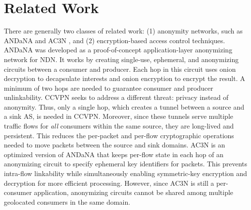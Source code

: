 \section{Related Work} \label{sec:related}

There are generally two classes of related work: (1) anonymity networks, such
as ANDaNA \cite{dibenedetto2011andana} and AC3N \cite{tsudik2016ac3n}, and
(2) encryption-based access control techniques. ANDaNA was developed as a
proof-of-concept application-layer anonymizing network for NDN. It works by
creating single-use, ephemeral, and anonymizing circuits between a consumer
and producer. Each hop in this circuit uses onion decryption to decapsulate
interests and onion encryption to encrypt the result. A minimum of two hops are
needed to guarantee consumer and producer unlinkability. CCVPN seeks to address
a different threat: privacy instead of anonymity. Thus, only a single hop, which
creates a tunnel between a source and a sink AS, is needed in CCVPN. Moreover,
since these tunnels serve multiple traffic flows for \emph{all} consumers within
the same source, they are long-lived and persistent. This reduces the per-packet
and per-flow cryptographic operations needed to move packets between the source
and sink domains. AC3N \cite{tsudik2016ac3n} is an optimized version of ANDaNA
that keeps per-flow state in each hop of an anonymizing circuit to specify
ephemeral key identifiers for packets. This prevents intra-flow linkability
while simultaneously enabling symmetric-key encryption and decryption for more
efficient processing. However, since AC3N is still a per-consumer application,
anonymizing circuits cannot be shared among multiple geolocated consumers
in the same domain.

